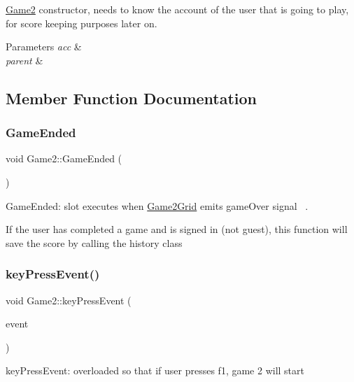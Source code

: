 \hyperlink{classGame2}{Game2} constructor, needs to know the account of the user that is going to play, for score keeping purposes later on. 


\begin{DoxyParams}{Parameters}
{\em acc} & \\
\hline
{\em parent} & \\
\hline
\end{DoxyParams}


\subsection{Member Function Documentation}
\mbox{\label{classGame2_a39a8191a0c66453ed1070db56415f2a9}} 
\subsubsection{\texorpdfstring{Game\+Ended}{GameEnded}}
{\footnotesize\ttfamily void Game2\+::\+Game\+Ended (\begin{DoxyParamCaption}{ }\end{DoxyParamCaption})\hspace{0.3cm}{\ttfamily [slot]}}



Game\+Ended\+: slot executes when \hyperlink{classGame2Grid}{Game2\+Grid} emits game\+Over signal~\newline
. 

If the user has completed a game and is signed in (not guest), this function will save the score by calling the history class \mbox{\label{classGame2_ac6326093ed2adead3b2b4b7e348e81a4}} 
\subsubsection{\texorpdfstring{key\+Press\+Event()}{keyPressEvent()}}
{\footnotesize\ttfamily void Game2\+::key\+Press\+Event (\begin{DoxyParamCaption}\item[{Q\+Key\+Event $\ast$}]{event }\end{DoxyParamCaption})}



key\+Press\+Event\+: overloaded so that if user presses f1, game 2 will start 


